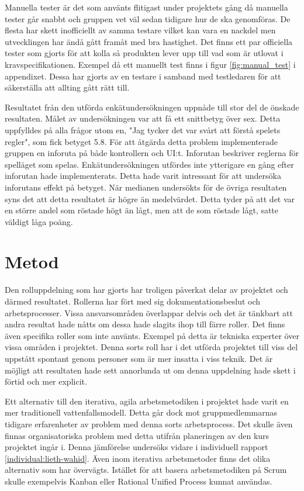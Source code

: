 Manuella tester är det som använts flitigast under projektets gång då manuella tester går snabbt och gruppen vet väl sedan tidigare hur de ska genomföras. De flesta har skett inofficiellt av samma testare vilket kan vara en nackdel men utvecklingen har ändå gått framåt med bra hastighet. Det finns ett par officiella tester som gjorts för att kolla så produkten lever upp till vad som är utlovat i kravspecifikationen. Exempel då ett manuellt test finns i figur \ref{fig:manual_test} i appendixet. Dessa har gjorts av en testare i samband med testledaren för att säkerställa att allting gått rätt till.

Resultatet från den utförda enkätundersökningen uppnåde till stor del de önskade resultaten. Målet av undersökningen var att få ett snittbetyg över sex. Detta uppfylldes på alla frågor utom en, "Jag tycker det var svårt att förstå spelets regler", som fick betyget 5.8. För att åtgärda detta problem implementerade gruppen en inforuta på både kontrollern och UI:t. Inforutan beskriver reglerna för spelläget som spelas. Enkätundersökningen utfördes inte ytterigare en gång efter inforutan hade implementerats. Detta hade varit intressant för att undersöka inforutans effekt på betyget. När medianen undersökts för de övriga resultaten syns det att detta resultatet är högre än medelvärdet. Detta tyder på att det var en större andel som röstade högt än lågt, men att de som röstade lågt, satte väldigt låga poäng.

\section{Metod}
\label{sec:discussion-method}
Den rolluppdelning som har gjorts har troligen påverkat delar av projektet och därmed resultatet. Rollerna har fört med sig dokumentationsbeslut och arbetsprocesser. Vissa ansvarsområden överlappar delvis och det är tänkbart att andra resultat hade nåtts om dessa hade slagits ihop till färre roller. Det finns även specifika roller som inte använts. Exempel på detta är tekniska experter över vissa områden i projektet. Denna sorts roll har i det utförda projektet till viss del uppstått spontant genom personer som är mer insatta i viss teknik. Det är möjligt att resultaten hade sett annorlunda ut om denna uppdelning hade skett i förtid och mer explicit.

Ett alternativ till den iterativa, agila arbetsmetodiken i projektet hade varit en mer traditionell vattenfallsmodell. Detta går dock mot gruppmedlemmarnas tidigare erfarenheter av problem med denna sorts arbetsprocess. Det skulle även finnas organisatoriska problem med detta utifrån planeringen av den kurs projektet ingår i. Denna jämförelse undersöks vidare i individuell rapport \ref{individual:lieth-wahid}. Även inom iterativa arbetsmetoder finns det olika alternativ som har övervägts. Istället för att basera arbetsmetodiken på Scrum skulle exempelvis Kanban\cite{kanban} eller Rational Unified Process\cite{RUP} kunnat användas.

